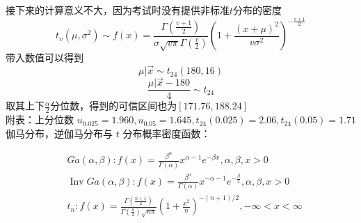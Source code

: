 \documentclass[12pt]{article}
\begin{document}
接下来的计算意义不大，因为考试时没有提供非标准$t$分布的密度\\
\[
t_v(\mu,\sigma^2) \sim f(x)=\frac{\Gamma(\frac{v+1}{2})}{\sigma \sqrt{v\pi} \Gamma(\frac{v}{2})}(1+\frac{(x+\mu)^2}{v\sigma^2})^{-\frac{v+1}{2}}
\]
带入数值可以得到
\[
\mu|\vec{x} \sim t_{24}(180,16)
\]
\[
\frac{\mu|\vec{x}-180}{4} \sim t_{24}
\]
取其上下$\frac{\alpha}{2}$分位数，得到的可信区间也为$[171.76,188.24]$\\



\noindent 附表：上分位数 $u_{0.025}=1.960, u_{0.05}=1.645, t_{24}(0.025)=2.06, t_{24}(0.05)=1.71$\\
伽马分布，逆伽马分布与 $t$ 分布概率密度函数：

$$
\begin{aligned}
& G a(\alpha, \beta): f(x)=\frac{\beta^{\alpha}}{\Gamma(\alpha)} x^{\alpha-1} e^{-\beta x}, \alpha, \beta, x>0 \\
& \operatorname{Inv} G a(\alpha, \beta): f(x)=\frac{\beta^{\alpha}}{\Gamma(\alpha)} x^{-\alpha-1} e^{-\frac{\beta}{x}}, \alpha, \beta, x>0 \\
& t_{n}: f(x)=\frac{\Gamma\left(\frac{n+1}{2}\right)}{\Gamma\left(\frac{n}{2}\right) \sqrt{n \pi}}\left(1+\frac{x^{2}}{n}\right)^{-(n+1) / 2},-\infty<x<\infty
\end{aligned}
$$
\end{document}
